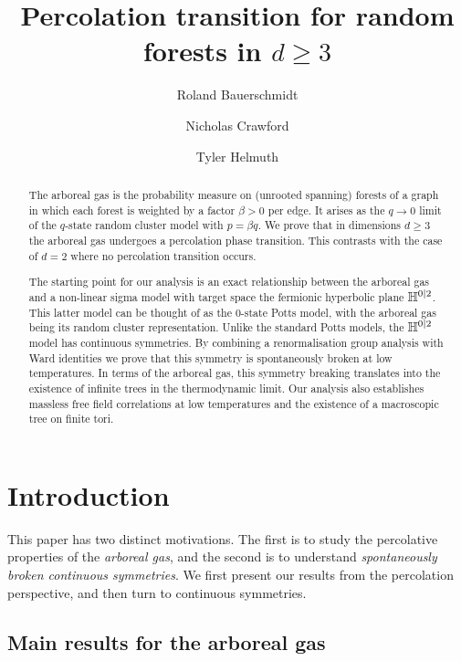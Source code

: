 \documentclass[11pt]{amsart}
\title{Percolation transition for random forests in $d\geq 3$}
\date{}
\author{Roland Bauerschmidt}
\author{Nicholas Crawford}
\author{Tyler Helmuth}
\numberwithin{equation}{section}
\numberwithin{theorem}{section}
\newcommand{\1}{{\bf 1}}
\begin{document}
\maketitle

\begin{abstract}
  The arboreal gas is the probability measure on (unrooted spanning)
  forests of a graph in which each forest is weighted by a factor
  $\beta>0$ per edge. It arises as the $q\to 0$ limit of
  the $q$-state random cluster model with $p=\beta q$.  We prove that in dimensions
  $d\geq 3$ the arboreal gas undergoes
  a percolation phase transition.  This contrasts
  with the case of $d=2$ where no percolation transition occurs.
  
  The starting point for our analysis is an exact relationship between
  the arboreal gas and a non-linear sigma model with target space the
  fermionic hyperbolic plane $\mathbb{H}^{0|2}$.  This latter model can be
  thought of as the $0$-state Potts model, with the arboreal gas being
  its random cluster representation. Unlike the standard Potts
  models, the $\mathbb{H}^{0|2}$ model has continuous symmetries. By
  combining a renormalisation group analysis with Ward identities we
  prove that this symmetry is spontaneously broken at low
  temperatures.  In terms of the arboreal gas, this symmetry breaking
  translates into the existence of infinite trees in the thermodynamic
  limit.  Our analysis also establishes massless free field
  correlations at low temperatures and the existence of a macroscopic
  tree on finite tori.
\end{abstract}

\setcounter{tocdepth}{2}
\tableofcontents

\section{Introduction}
\label{sec:intro}

This paper has two distinct motivations. The first is to study the
percolative properties of the \emph{arboreal gas}, and the second is
to understand \emph{spontaneously broken continuous symmetries}. We
first present our results from the percolation perspective, and then
turn to continuous symmetries.

\subsection{Main results for the arboreal gas}
\end{document}
